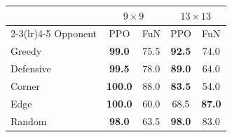\begin{table}[t]
  \centering
  \label{tab:phase1}
  \small
  \begin{tabular}{@{}l cc cc@{}}
    \toprule
    & \multicolumn{2}{c}{$9\times9$} & \multicolumn{2}{c}{$13\times13$} \\
    \cmidrule(lr){2-3}\cmidrule(lr){4-5}
    Opponent & PPO & FuN & PPO & FuN \\
    \midrule
    Greedy & \textbf{99.0} & 75.5 & \textbf{92.5} & 74.0 \\
    Defensive & \textbf{99.5} & 78.0 & \textbf{89.0} & 64.0 \\
    Corner & \textbf{100.0} & 88.0 & \textbf{83.5} & 54.0 \\
    Edge & \textbf{100.0} & 60.0 & 68.5 & \textbf{87.0} \\
    Random & \textbf{98.0} & 63.5 & \textbf{98.0} & 83.0 \\
    \bottomrule
  \end{tabular}
\end{table}
